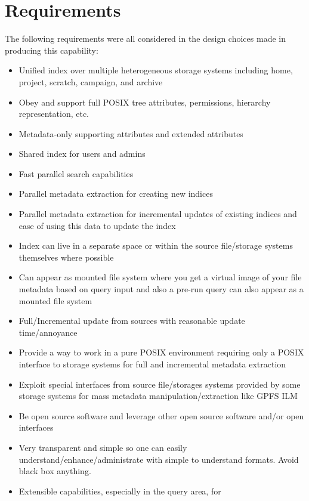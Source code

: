 \section{Requirements}
The following requirements were all considered in the design choices
made in producing this capability:

\begin{itemize}
\item Unified index over multiple heterogeneous storage systems
  including home, project, scratch, campaign, and archive
\item Obey and support full POSIX tree attributes, permissions,
  hierarchy representation, etc.
\item Metadata-only supporting attributes and extended attributes
\item Shared index for users and admins
\item Fast parallel search capabilities
\item Parallel metadata extraction for creating new indices
\item Parallel metadata extraction for incremental updates of existing
  indices and ease of using this data to update the index
\item Index can live in a separate space or within the source
  file/storage systems themselves where possible
\item Can appear as mounted file system where you get a virtual image
  of your file metadata based on query input and also a pre-run query
  can also appear as a mounted file system
\item Full/Incremental update from sources with reasonable update \\
  time/annoyance
\item Provide a way to work in a pure POSIX environment requiring only
  a POSIX interface to storage systems for full and incremental
  metadata extraction
\item Exploit special interfaces from source file/storages systems
  provided by some storage systems for mass metadata
  manipulation/extraction like GPFS ILM
\item Be open source software and leverage other open source software
  and/or open interfaces
\item Very transparent and simple so one can easily \\
  understand/enhance/administrate with simple to understand formats.
  Avoid black box anything.
\item Extensible capabilities, especially in the query area, for

\end{itemize}

